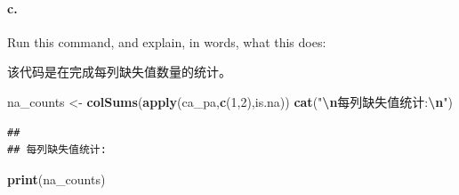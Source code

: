 \documentclass[
]{article}
\newenvironment{Shaded}{\begin{snugshade}}{\end{snugshade}}
\newcommand{\DecValTok}[1]{\textcolor[rgb]{0.00,0.00,0.81}{#1}}
\newcommand{\FunctionTok}[1]{\textcolor[rgb]{0.13,0.29,0.53}{\textbf{#1}}}
\newcommand{\NormalTok}[1]{#1}
\newcommand{\OtherTok}[1]{\textcolor[rgb]{0.56,0.35,0.01}{#1}}
\newcommand{\SpecialCharTok}[1]{\textcolor[rgb]{0.81,0.36,0.00}{\textbf{#1}}}
\newcommand{\StringTok}[1]{\textcolor[rgb]{0.31,0.60,0.02}{#1}}
\begin{document}
\paragraph{c.~}\label{c.}

Run this command, and explain, in words, what this does:

该代码是在完成每列缺失值数量的统计。

\begin{Shaded}
\begin{Highlighting}[]
\NormalTok{na\_counts }\OtherTok{\textless{}{-}} \FunctionTok{colSums}\NormalTok{(}\FunctionTok{apply}\NormalTok{(ca\_pa,}\FunctionTok{c}\NormalTok{(}\DecValTok{1}\NormalTok{,}\DecValTok{2}\NormalTok{),is.na))}
\FunctionTok{cat}\NormalTok{(}\StringTok{"}\SpecialCharTok{\textbackslash{}n}\StringTok{每列缺失值统计:}\SpecialCharTok{\textbackslash{}n}\StringTok{"}\NormalTok{)}
\end{Highlighting}
\end{Shaded}

\begin{verbatim}
## 
## 每列缺失值统计:
\end{verbatim}

\begin{Shaded}
\begin{Highlighting}[]
\FunctionTok{print}\NormalTok{(na\_counts)}
\end{Highlighting}
\end{Shaded}
\end{document}
